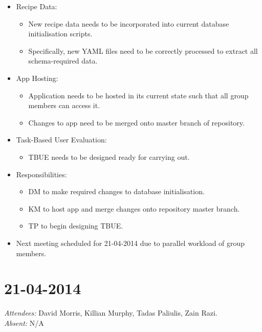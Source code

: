 \documentclass{article}
\begin{document}
\begin{itemize}
\item Recipe Data:
  \begin{itemize}
  \item New recipe data needs to be incorporated into current database initialisation scripts.
  \item Specifically, new YAML files need to be correctly processed to extract all schema-required data.
  \end{itemize}
\item App Hosting:
  \begin{itemize}
  \item Application needs to be hosted in its current state such that all group members can access it.
  \item Changes to app need to be merged onto master branch of repository.
  \end{itemize}
\item Task-Based User Evaluation:
  \begin{itemize}
  \item TBUE needs to be designed ready for carrying out.
  \end{itemize}
\item Responsibilities:
  \begin{itemize}
  \item DM to make required changes to database initialisation.
  \item KM to host app and merge changes onto repository master branch.
  \item TP to begin designing TBUE.
  \end{itemize}
\item Next meeting scheduled for 21-04-2014 due to parallel workload of group members.
\end{itemize}

\clearpage

\section*{21-04-2014}
\vspace{0.5cm}
\emph{Attendees: }David Morris, Killian Murphy, Tadas Paliulis, Zain Razi.
\\
\emph{Absent: }N/A
\end{document}
